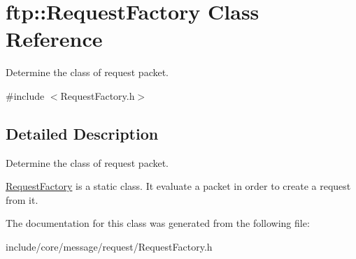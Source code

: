 \hypertarget{classftp_1_1_request_factory}{\section{ftp\-:\-:Request\-Factory Class Reference}
\label{classftp_1_1_request_factory}
}


Determine the class of request packet.  




{\ttfamily \#include $<$Request\-Factory.\-h$>$}



\subsection{Detailed Description}
Determine the class of request packet. 

\hyperlink{classftp_1_1_request_factory}{Request\-Factory} is a static class. It evaluate a packet in order to create a request from it. 

The documentation for this class was generated from the following file\-:\begin{DoxyCompactItemize}
\item 
include/core/message/request/Request\-Factory.\-h\end{DoxyCompactItemize}
